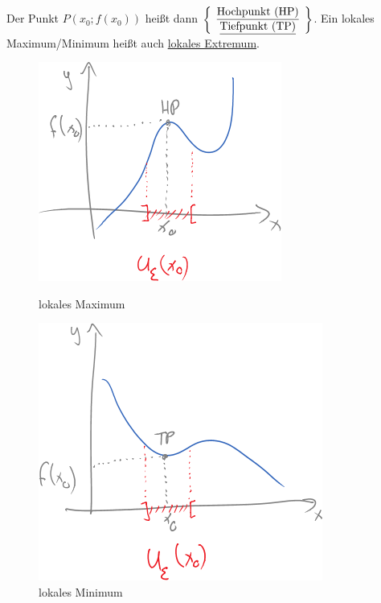 Der Punkt $P(x_0;f(x_0))$ heißt dann $\left\{\begin{array}{c}\underline{\text{Hochpunkt (HP)}}\\\underline{\text{Tiefpunkt (TP)}}\end{array}\right\}$. Ein lokales Maximum/Minimum heißt auch \ul{lokales Extremum}.
\begin{figure}[h!]
	\centering
	\begin{minipage}{0.4\linewidth}
		\centering\includegraphics[width=\linewidth]{Bilder/149}
		\caption{lokales Maximum}
	\end{minipage}
	\qquad
	\begin{minipage}{0.4\linewidth}
		\centering\includegraphics[width=\linewidth]{Bilder/150}
		\caption{lokales Minimum}
	\end{minipage}
\end{figure}

